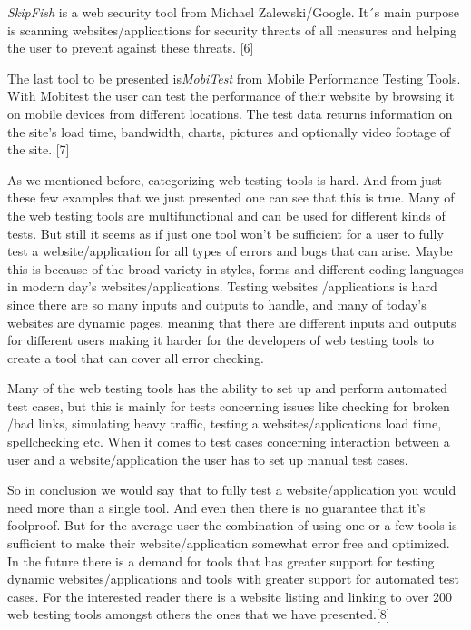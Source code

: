 \documentclass[a4paper]{article}
\begin{document}
\begin {itemize}
 \emph {SkipFish} is a web security tool from Michael Zalewski/Google. It´s main purpose is scanning websites/applications for 
 security threats of all measures and helping the user to prevent against these threats. [6] 
 
 The last tool to be presented is\emph {MobiTest} from Mobile Performance Testing Tools.  With Mobitest the user can test the 
 performance of their website by browsing it on mobile devices from different locations. The test data returns information 
 on the site’s load time, bandwidth, charts, pictures and optionally video footage of the site. [7] 
 
 
 As we mentioned before, categorizing web testing tools is hard. And from just these few examples that we just presented 
 one can see that this is true. Many of the web testing tools are multifunctional and can be used for different kinds of 
 tests. But still it seems as if just one tool won’t be sufficient for a user to fully test a website/application for all 
 types of errors and bugs that can arise. Maybe this is because of the broad variety in styles, forms and different coding 
 languages in modern day’s websites/applications.  Testing websites /applications is hard since there are so many inputs 
 and outputs to handle, and many of today’s websites are dynamic pages, meaning that there are different inputs and outputs 
 for different users making it harder for the developers of web testing tools to create a tool that can cover all error checking.
  
 Many of the web testing tools has the ability to set up and perform automated test cases, but this is mainly for tests 
 concerning issues like checking for broken /bad links, simulating heavy traffic, testing a websites/applications load 
 time, spellchecking etc. When it comes to test cases concerning interaction between a user and a website/application 
 the user has to set up manual test cases.  
  
 So in conclusion we would say that to fully test a website/application you would need more than a single tool. And even then 
 there is no guarantee that it’s foolproof.  But for the average user the combination of using one or a few tools is 
 sufficient to make their website/application somewhat error free and optimized. In the future there is a demand for tools 
 that has greater support for testing dynamic websites/applications and tools with greater support for automated test cases.  
 For the interested reader there is a website listing and linking to over 200 web testing tools amongst others the ones that
 we have presented.[8] 
   

\end{itemize}
\end{document}

